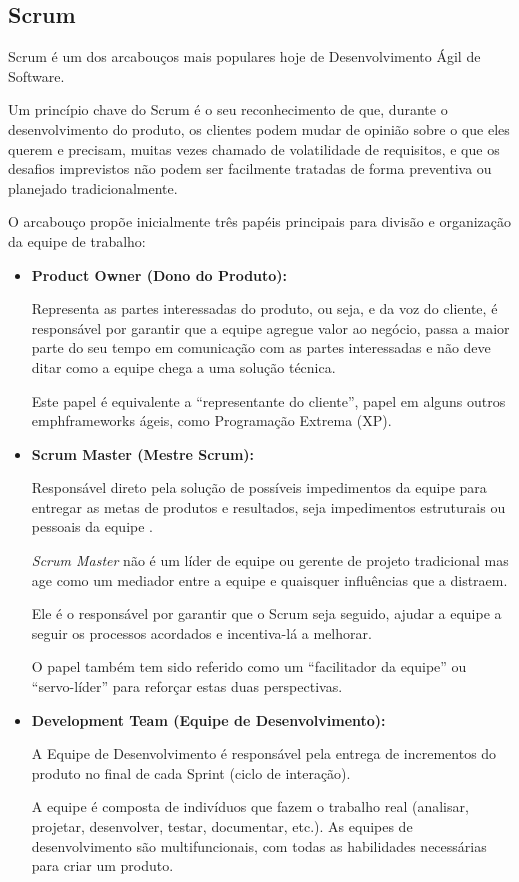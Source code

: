 \subsection{Scrum}
\par Scrum é um dos arcabouços mais populares hoje de Desenvolvimento Ágil de Software.
\par Um princípio chave do Scrum é o seu reconhecimento de que, durante o desenvolvimento do produto, os clientes podem mudar de opinião sobre o que eles querem e precisam, muitas vezes chamado de volatilidade de requisitos, e que os desafios imprevistos não podem ser facilmente tratadas de forma preventiva ou planejado tradicionalmente.
\par O arcabouço propõe inicialmente três papéis principais para divisão e organização da equipe de trabalho:
\begin{itemize}
\item\textbf{Product Owner (Dono do Produto):}
\par Representa as partes interessadas do produto, ou seja, e da voz do cliente, é responsável por garantir que a equipe agregue valor ao negócio, passa a maior parte do seu tempo em comunicação com as partes interessadas e não deve ditar como a equipe chega a uma solução técnica.
\par Este papel é equivalente a ``representante do cliente'', papel em alguns outros emph{frameworks} ágeis, como Programação Extrema (XP).
\item\textbf{Scrum Master (Mestre Scrum):}
\par Responsável direto pela solução de possíveis impedimentos da equipe para entregar as metas de produtos e resultados, seja impedimentos estruturais ou pessoais da equipe .
\par \emph{Scrum Master} não é um líder de equipe ou gerente de projeto tradicional mas age como um mediador entre a equipe e quaisquer influências que a distraem.
\par Ele é o responsável por garantir que o Scrum seja seguido, ajudar a equipe a seguir os processos acordados e incentiva-lá a melhorar.
\par O papel também tem sido referido como um ``facilitador da equipe'' ou ``servo-líder'' para reforçar estas duas perspectivas.
\item\textbf{Development Team (Equipe de Desenvolvimento):}
\par A Equipe de Desenvolvimento é responsável pela entrega de incrementos do produto no final de cada Sprint (ciclo de interação).
\par A equipe é composta de indivíduos que fazem o trabalho real (analisar, projetar, desenvolver, testar, documentar, etc.). As equipes de desenvolvimento são multifuncionais, com todas as habilidades necessárias para criar um produto.
\end{itemize}
